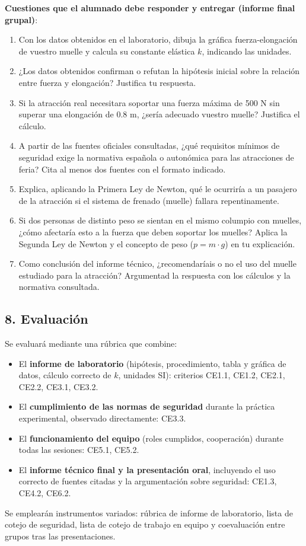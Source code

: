 \documentclass[11pt,a4paper]{article}
\begin{document}
\textbf{Cuestiones que el alumnado debe responder y entregar (informe final grupal)}:
\begin{enumerate}
    \item Con los datos obtenidos en el laboratorio, dibuja la gráfica fuerza-elongación de vuestro muelle y calcula su constante elástica $k$, indicando las unidades.
    \item ¿Los datos obtenidos confirman o refutan la hipótesis inicial sobre la relación entre fuerza y elongación? Justifica tu respuesta.
    \item Si la atracción real necesitara soportar una fuerza máxima de 500 N sin superar una elongación de 0.8 m, ¿sería adecuado vuestro muelle? Justifica el cálculo.
    \item A partir de las fuentes oficiales consultadas, ¿qué requisitos mínimos de seguridad exige la normativa española o autonómica para las atracciones de feria? Cita al menos dos fuentes con el formato indicado.
    \item Explica, aplicando la Primera Ley de Newton, qué le ocurriría a un pasajero de la atracción si el sistema de frenado (muelle) fallara repentinamente.
    \item Si dos personas de distinto peso se sientan en el mismo columpio con muelles, ¿cómo afectaría esto a la fuerza que deben soportar los muelles? Aplica la Segunda Ley de Newton y el concepto de peso ($p = m \cdot g$) en tu explicación.
    \item Como conclusión del informe técnico, ¿recomendaríais o no el uso del muelle estudiado para la atracción? Argumentad la respuesta con los cálculos y la normativa consultada.
\end{enumerate}

\subsection*{8. Evaluación}
Se evaluará mediante una rúbrica que combine:
\begin{itemize}
    \item El \textbf{informe de laboratorio} (hipótesis, procedimiento, tabla y gráfica de datos, cálculo correcto de $k$, unidades SI): criterios CE1.1, CE1.2, CE2.1, CE2.2, CE3.1, CE3.2.
    \item El \textbf{cumplimiento de las normas de seguridad} durante la práctica experimental, observado directamente: CE3.3.
    \item El \textbf{funcionamiento del equipo} (roles cumplidos, cooperación) durante todas las sesiones: CE5.1, CE5.2.
    \item El \textbf{informe técnico final y la presentación oral}, incluyendo el uso correcto de fuentes citadas y la argumentación sobre seguridad: CE1.3, CE4.2, CE6.2.
\end{itemize}
Se emplearán instrumentos variados: rúbrica de informe de laboratorio, lista de cotejo de seguridad, lista de cotejo de trabajo en equipo y coevaluación entre grupos tras las presentaciones.
\end{document}
